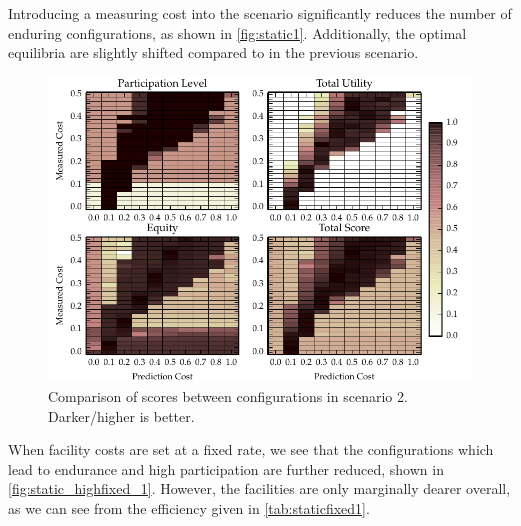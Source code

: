 Introducing a measuring cost into the scenario significantly reduces the
number of enduring configurations, as shown in \autoref{fig:static1}.
Additionally, the optimal equilibria are slightly shifted compared to in the
previous scenario.

\begin{figure}
\includegraphics{gfx/kc/static_1.pdf} 
\caption[Comparison of scores between configurations in scenario 2.]{Comparison of scores between configurations in scenario 2. Darker/higher is better.}\label{fig:static1}
\end{figure}

When facility costs are set at a fixed rate, we see that the configurations
which lead to endurance and high participation are further reduced, shown in
\autoref{fig:static_highfixed_1}. However, the facilities are only marginally
dearer overall, as we can see from the efficiency given in
\autoref{tab:staticfixed1}.


